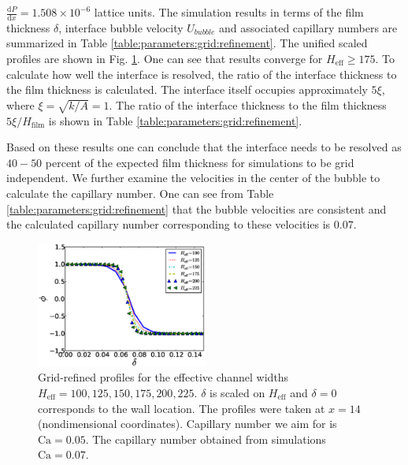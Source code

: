 \documentclass{CFD2011}
\newcommand{\Ca}{\mathrm{Ca}}
\begin{document}
$\frac{\mathrm{d}P}{\mathrm{d}x}=1.508 \times 10^{-6}$ lattice units.
The
simulation results in terms of the film thickness $\delta$, interface bubble
velocity $U_{bubble}$ and associated capillary numbers are summarized in Table
\ref{table:parameters:grid:refinement}. 
The unified scaled profiles are shown in Fig. \ref{fig:grid:profiles}. One can
see that results converge for $H_{\mathrm{eff}}\geq 175$. To calculate how well the interface is
resolved, the ratio of the interface thickness to the film thickness is calculated. The
interface itself occupies approximately $5 \xi$, where
$\xi=\sqrt{k/A}=1$. The ratio of the interface thickness to the film thickness
$5\xi/H_{\mathrm{film}}$ is shown in Table \ref{table:parameters:grid:refinement}.

Based on these results one can conclude
that
 the interface needs to be resolved as $40-50$ percent of the
expected film thickness for simulations to be grid independent. We further examine the
velocities in the center of the bubble to calculate the capillary number. One can see from Table
\ref{table:parameters:grid:refinement} that the bubble velocities are consistent and the
calculated capillary number corresponding to these velocities is $0.07$.
\begin{figure}[ht]
\includegraphics[width=0.5\textwidth]{Figures/norm_grid_profs.eps}
\caption{Grid-refined profiles for the effective
channel widths
$H_{\mathrm{eff}}=100,125,150,175,200,225$. $\delta$ is scaled on $H_{\mathrm{eff}}$ and $\delta=0$
corresponds to the wall location. The profiles were taken at $x=14$ (nondimensional coordinates).
Capillary number we aim for is $\Ca=0.05$. The capillary number obtained from simulations
$\Ca=0.07$. 
\label{fig:grid:profiles}}
\end{figure}
\end{document}
